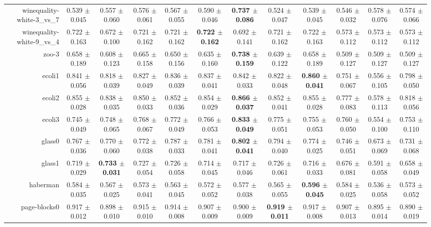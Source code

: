 \begin{table}[!ht]
{\begin{tabular}{r c c c c c c c c c c c}
winequality-white-3\_vs\_7 & 0.539 $\pm$ 0.045 & 0.557 $\pm$ 0.060 & 0.576 $\pm$ 0.061 & 0.567 $\pm$ 0.055 & 0.590 $\pm$ 0.046 & \textbf{0.737 $\pm$ 0.086} & 0.524 $\pm$ 0.047 & 0.539 $\pm$ 0.045 & 0.546 $\pm$ 0.032 & 0.578 $\pm$ 0.076 & 0.574 $\pm$ 0.066 \\
winequality-white-9\_vs\_4 & 0.722 $\pm$ 0.163 & 0.672 $\pm$ 0.100 & 0.721 $\pm$ 0.162 & 0.721 $\pm$ 0.162 & \textbf{0.722 $\pm$ 0.162} & 0.692 $\pm$ 0.141 & 0.721 $\pm$ 0.162 & 0.722 $\pm$ 0.163 & 0.573 $\pm$ 0.112 & 0.573 $\pm$ 0.112 & 0.573 $\pm$ 0.112 \\
zoo-3 & 0.658 $\pm$ 0.189 & 0.608 $\pm$ 0.123 & 0.665 $\pm$ 0.158 & 0.650 $\pm$ 0.156 & 0.635 $\pm$ 0.160 & \textbf{0.738 $\pm$ 0.159} & 0.639 $\pm$ 0.122 & 0.658 $\pm$ 0.189 & 0.509 $\pm$ 0.127 & 0.509 $\pm$ 0.127 & 0.509 $\pm$ 0.127 \\
ecoli1 & 0.841 $\pm$ 0.056 & 0.818 $\pm$ 0.039 & 0.827 $\pm$ 0.049 & 0.836 $\pm$ 0.039 & 0.837 $\pm$ 0.041 & 0.842 $\pm$ 0.033 & 0.822 $\pm$ 0.048 & \textbf{0.860 $\pm$ 0.041} & 0.751 $\pm$ 0.067 & 0.556 $\pm$ 0.105 & 0.798 $\pm$ 0.050 \\
ecoli2 & 0.855 $\pm$ 0.028 & 0.838 $\pm$ 0.035 & 0.850 $\pm$ 0.033 & 0.852 $\pm$ 0.036 & 0.854 $\pm$ 0.029 & \textbf{0.866 $\pm$ 0.037} & 0.852 $\pm$ 0.041 & 0.855 $\pm$ 0.028 & 0.777 $\pm$ 0.083 & 0.578 $\pm$ 0.113 & 0.818 $\pm$ 0.056 \\
ecoli3 & 0.745 $\pm$ 0.049 & 0.748 $\pm$ 0.065 & 0.768 $\pm$ 0.067 & 0.772 $\pm$ 0.049 & 0.766 $\pm$ 0.053 & \textbf{0.833 $\pm$ 0.049} & 0.775 $\pm$ 0.051 & 0.755 $\pm$ 0.053 & 0.760 $\pm$ 0.050 & 0.554 $\pm$ 0.100 & 0.753 $\pm$ 0.110 \\
glass0 & 0.767 $\pm$ 0.036 & 0.770 $\pm$ 0.060 & 0.772 $\pm$ 0.038 & 0.787 $\pm$ 0.033 & 0.781 $\pm$ 0.041 & \textbf{0.802 $\pm$ 0.041} & 0.794 $\pm$ 0.040 & 0.774 $\pm$ 0.025 & 0.746 $\pm$ 0.051 & 0.673 $\pm$ 0.069 & 0.731 $\pm$ 0.068 \\
glass1 & 0.719 $\pm$ 0.029 & \textbf{0.733 $\pm$ 0.031} & 0.727 $\pm$ 0.054 & 0.726 $\pm$ 0.058 & 0.714 $\pm$ 0.045 & 0.717 $\pm$ 0.046 & 0.726 $\pm$ 0.061 & 0.716 $\pm$ 0.033 & 0.676 $\pm$ 0.081 & 0.591 $\pm$ 0.058 & 0.658 $\pm$ 0.049 \\
haberman & 0.584 $\pm$ 0.035 & 0.567 $\pm$ 0.025 & 0.573 $\pm$ 0.041 & 0.563 $\pm$ 0.045 & 0.572 $\pm$ 0.052 & 0.577 $\pm$ 0.038 & 0.565 $\pm$ 0.055 & \textbf{0.596 $\pm$ 0.045} & 0.584 $\pm$ 0.025 & 0.536 $\pm$ 0.058 & 0.573 $\pm$ 0.052 \\
page-blocks0 & 0.917 $\pm$ 0.012 & 0.898 $\pm$ 0.010 & 0.915 $\pm$ 0.010 & 0.914 $\pm$ 0.008 & 0.907 $\pm$ 0.009 & 0.900 $\pm$ 0.009 & \textbf{0.919 $\pm$ 0.011} & 0.917 $\pm$ 0.008 & 0.907 $\pm$ 0.013 & 0.895 $\pm$ 0.014 & 0.890 $\pm$ 0.019 \\

\end{tabular}}
\end{table}
